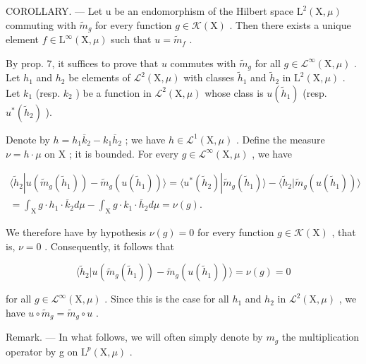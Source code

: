 COROLLARY. --- Let u be an endomorphism of the Hilbert space \(\mathrm{L}^{2}(\mathrm{X},\mu)\) commuting with \(\widetilde{m}_{g}\) for every function \(g\in\mathcal{K}(\mathrm{X})\) . Then there exists a unique element \(f\in\mathrm{L}^{\infty}(\mathrm{X},\mu)\) such that \(u=\widetilde{m}_{f}\) .

By prop. 7, it suffices to prove that \(u\) commutes with \(\widetilde{m}_{g}\) for all \(g\in\mathcal{L}^{\infty}(\mathrm{X},\mu)\) . Let \(h_{1}\) and \(h_{2}\) be elements of \(\mathcal{L}^{2}(\mathrm{X},\mu)\) with classes \(\widetilde{h}_{1}\) and \(\widetilde{h}_{2}\) in \(\mathrm{L}^{2}(\mathrm{X},\mu)\) . Let \(k_{1}\) (resp. \(k_{2}\) ) be a function in \(\mathcal{L}^{2}(\mathrm{X},\mu)\) whose class is \(u(\widetilde{h}_{1})\) (resp. \(u^{*}(\widetilde{h}_{2})\) ).

Denote by \(h = h_1 \overline{k}_2 - k_1 \overline{h}_2\) ; we have \(h \in \mathcal{L}^1(\mathrm{X}, \mu)\) . Define the measure \(\nu = h \cdot \mu\) on \(\mathrm{X}\) ; it is bounded. For every \(g \in \mathcal{L}^\infty(\mathrm{X}, \mu)\) , we have

\[
\begin{array}{c} \langle \widetilde {h} _ {2} | u (\widetilde {m} _ {g} (\widetilde {h} _ {1})) - \widetilde {m} _ {g} (u (\widetilde {h} _ {1})) \rangle = \langle u ^ {*} (\widetilde {h} _ {2}) | \widetilde {m} _ {g} (\widetilde {h} _ {1}) \rangle - \langle \widetilde {h} _ {2} | \widetilde {m} _ {g} (u (\widetilde {h} _ {1})) \rangle \\ = \int_ {\mathrm{X}} g \cdot h _ {1} \cdot \overline {{k}} _ {2} d \mu - \int_ {\mathrm{X}} g \cdot k _ {1} \cdot \overline {{h}} _ {2} d \mu = \nu (g). \end{array}
\]

We therefore have by hypothesis \(\nu(g) = 0\) for every function \(g \in \mathcal{K}(\mathrm{X})\) , that is, \(\nu = 0\) . Consequently, it follows that

\[
\langle \widetilde {h} _ {2} | u (\widetilde {m} _ {g} (\widetilde {h} _ {1})) - \widetilde {m} _ {g} (u (\widetilde {h} _ {1})) \rangle = \nu (g) = 0
\]

for all \(g \in \mathcal{L}^{\infty}(\mathrm{X},\mu)\) . Since this is the case for all \(h_1\) and \(h_2\) in \(\mathcal{L}^2 (\mathrm{X},\mu)\) , we have \(u\circ \widetilde{m}_g = \widetilde{m}_g\circ u\) .

Remark. --- In what follows, we will often simply denote by \(m_{g}\) the multiplication operator by g on \(\mathrm{L}^{p}(\mathrm{X},\mu)\) .

